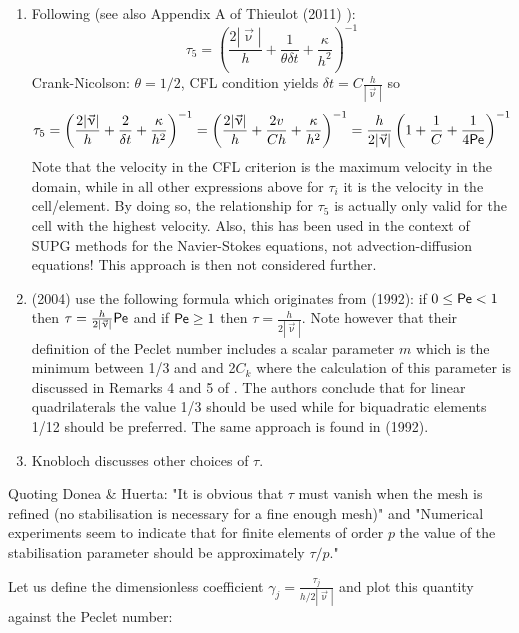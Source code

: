 \begin{enumerate}
\item Following \textcite{teos00} (see also Appendix A of Thieulot (2011) \cite{thie11}):
\[
\tau_5 = \left( \frac{2 |\vec{\upnu}|}{h} + \frac{1}{\theta \delta t} + \frac{\kappa}{h^2} \right)^{-1}  
\]
Crank-Nicolson: $\theta=1/2$, CFL condition yields $\delta t = C \frac{h}{|\vec\upnu|}$ so 
\[
\tau_5 = \left( \frac{2 |\vec{\upnu}|}{h} + \frac{2}{\delta t}+  \frac{\kappa}{h^2}  \right)^{-1}  
= \left( \frac{2 |\vec{\upnu}|}{h} + \frac{2 v}{C h} +  \frac{\kappa}{h^2}  \right)^{-1}  
= \frac{h}{2 |\vec{\upnu}|}  \left( 1 + \frac{1}{C} + \frac{1}{4 {\mathsf{Pe}}} \right)^{-1} \nonumber 
\]
Note that the velocity in the CFL criterion is the maximum velocity in the domain, while 
in all other expressions above for $\tau_i$ it is the velocity in the cell/element. 
By doing so, the relationship  for $\tau_5$ is actually only valid for the cell with the 
highest velocity. 
Also, this has been used in the context of SUPG methods for the Navier-Stokes equations, 
not advection-diffusion equations! This approach is then not considered further.

\item \textcite{frhm04} (2004) use the following formula which originates from 
\textcite{frfh92} (1992): if $0\le {\mathsf{Pe}} < 1$ then
$\tau = \frac{h}{2 |\vec\upnu|} {\mathsf{Pe}}$ and if ${\mathsf{Pe}} \ge 1$ then $\tau = \frac{h}{2 |\vec\upnu|}$.
Note however that their definition of the Peclet number includes a scalar parameter $m$ which is 
the minimum between 1/3 and and 2$C_k$ where the calculation of this parameter is discussed in 
Remarks 4 and 5 of \cite{frfh92}. The authors conclude that for linear quadrilaterals the value
1/3 should be used while for biquadratic elements 1/12 should be preferred.
The same approach is found in \textcite{brbf92} (1992). 

\item Knobloch \cite{knob08} discusses other choices of $\tau$.


\end{enumerate}

Quoting Donea \& Huerta: "It is obvious that $\tau$ must vanish when the mesh is refined (no stabilisation
is necessary for a fine enough mesh)" and "Numerical experiments seem to indicate that for 
finite elements of order $p$ the value of the stabilisation parameter should be approximately 
$\tau/p$."

Let us define the dimensionless coefficient 
$\gamma_j=\frac{\tau_j}{h/2|\vec\upnu|}$ and 
plot this quantity against the Peclet number:

